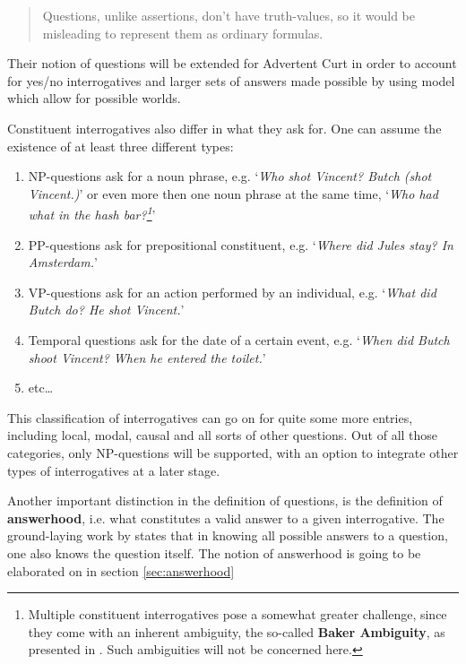 \documentclass[a4paper]{article}
\newcommand{\term}[1]{\textsf{\textbf{#1}}} %
\newcommand{\pn}{\textsf} %
\newcommand{\example}[1]{`\textit{#1}'} %
\newenvironment{quotes}{\begin{quote}\sf}{\rm\end{quote}}
\newcommand{\acurt}{\pn{Advertent Curt}}
\theoremstyle{remark}
\theoremstyle{remark}
\theoremstyle{definition}
\theoremstyle{definition}
\begin{document}
\begin{quotes}
  Questions, unlike assertions, don't have truth-values, so it would be
  misleading to represent them as ordinary formulas.
\end{quotes}

Their notion of questions will be extended for \acurt{} in order to account for
yes/no interrogatives and larger sets of answers made possible by using model
which allow for possible worlds.

Constituent interrogatives also differ in what they ask for. One can assume the
existence of at least three different types:

\begin{enumerate}
  \item NP-questions ask for a noun phrase, e.g. \example{Who shot Vincent?
  Butch (shot Vincent.)} or even more then one noun phrase at the same time, \example{Who had
  what in the hash bar?\footnote{Multiple constituent interrogatives pose a
  somewhat greater challenge, since they come with an inherent ambiguity, the
  so-called \term{Baker Ambiguity}, as presented in \cite{baker:1970}.
  Such ambiguities will not be concerned here.}}
  \item PP-questions ask for prepositional constituent, e.g. \example{Where did
  Jules stay? In Amsterdam.}
  \item VP-questions ask for an action performed by an individual, e.g.
  \example{What did Butch do? He shot Vincent.}
  \item Temporal questions ask for the date of a certain event, e.g.
  \example{When did Butch shoot Vincent? When he entered the toilet.}
  \item etc\ldots
\end{enumerate}

This classification of interrogatives can go on for quite some more entries,
including local, modal, causal and all sorts of other questions. Out of all
those categories, only NP-questions will be supported, with an option to
integrate other types of interrogatives at a later stage.


Another important distinction in the definition of questions, is the definition
of \term{answerhood}, i.e. what constitutes a valid answer to a given
interrogative. The ground-laying work by \cite{hamblin:q} states that in knowing
all possible answers to a question, one also knows the question itself. The
notion of answerhood is going to be elaborated on in section \ref{sec:answerhood}
\end{document}
